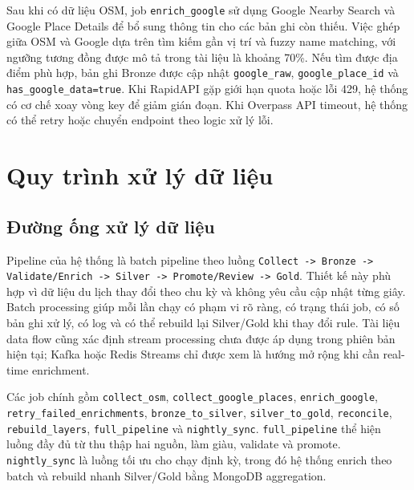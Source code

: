 \documentclass[12pt,a4paper]{article}
\begin{document}
Sau khi có dữ liệu OSM, job \texttt{enrich\_google} sử dụng Google Nearby Search và Google Place Details để bổ sung thông tin cho các bản ghi còn thiếu. Việc ghép giữa OSM và Google dựa trên tìm kiếm gần vị trí và fuzzy name matching, với ngưỡng tương đồng được mô tả trong tài liệu là khoảng 70\%. Nếu tìm được địa điểm phù hợp, bản ghi Bronze được cập nhật \texttt{google\_raw}, \texttt{google\_place\_id} và \texttt{has\_google\_data=true}. Khi RapidAPI gặp giới hạn quota hoặc lỗi 429, hệ thống có cơ chế xoay vòng key để giảm gián đoạn. Khi Overpass API timeout, hệ thống có thể retry hoặc chuyển endpoint theo logic xử lý lỗi.

\section{Quy trình xử lý dữ liệu}

\subsection{Đường ống xử lý dữ liệu}

Pipeline của hệ thống là batch pipeline theo luồng \texttt{Collect -> Bronze -> Validate/Enrich -> Silver -> Promote/Review -> Gold}. Thiết kế này phù hợp vì dữ liệu du lịch thay đổi theo chu kỳ và không yêu cầu cập nhật từng giây. Batch processing giúp mỗi lần chạy có phạm vi rõ ràng, có trạng thái job, có số bản ghi xử lý, có log và có thể rebuild lại Silver/Gold khi thay đổi rule. Tài liệu data flow cũng xác định stream processing chưa được áp dụng trong phiên bản hiện tại; Kafka hoặc Redis Streams chỉ được xem là hướng mở rộng khi cần real-time enrichment.

Các job chính gồm \texttt{collect\_osm}, \texttt{collect\_google\_places}, \texttt{enrich\_google}, \texttt{retry\_failed\_enrichments}, \texttt{bronze\_to\_silver}, \texttt{silver\_to\_gold}, \texttt{reconcile}, \texttt{rebuild\_layers}, \texttt{full\_pipeline} và \texttt{nightly\_sync}. \texttt{full\_pipeline} thể hiện luồng đầy đủ từ thu thập hai nguồn, làm giàu, validate và promote. \texttt{nightly\_sync} là luồng tối ưu cho chạy định kỳ, trong đó hệ thống enrich theo batch và rebuild nhanh Silver/Gold bằng MongoDB aggregation.
\end{document}
